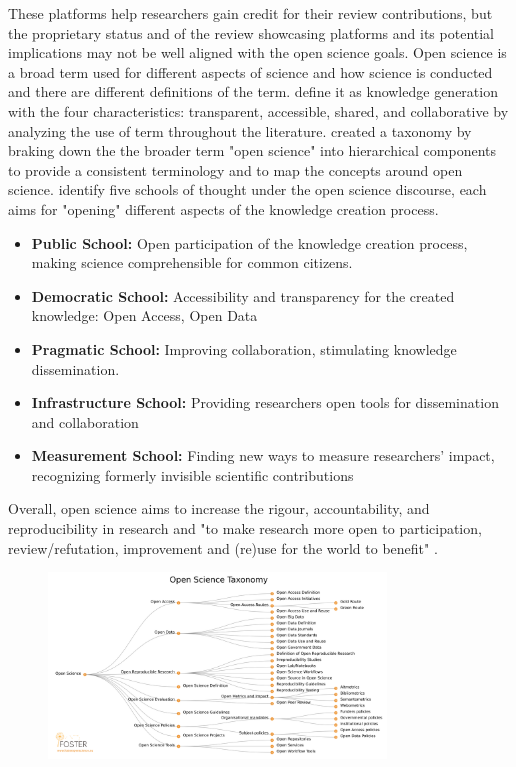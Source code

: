 These platforms help researchers gain credit for their review contributions, but the proprietary status and of the review showcasing platforms and its potential implications may not be well aligned with the open science goals. Open science is a broad term used for different aspects of science and how science is conducted and there are different definitions of the term. \cite{VicenteSaez.2018} define it as knowledge generation with the four characteristics: transparent, accessible, shared, and collaborative by analyzing the use of term throughout the literature. \cite{Pontika.2015} created a taxonomy by braking down the the broader term "open science" into hierarchical components to provide a consistent terminology and to map the concepts around open science. \cite{Fecher.2013} identify five  schools of thought under the open science discourse, each aims for "opening" different aspects of the knowledge creation process. 

\begin{itemize}
    \item \textbf{Public School:} Open participation of the knowledge creation process, making science comprehensible for common citizens.
    \item \textbf{Democratic School:} Accessibility and transparency for the created knowledge: Open Access, Open Data
    \item \textbf{Pragmatic School:} Improving collaboration, stimulating knowledge dissemination.
    \item \textbf{Infrastructure School:} Providing researchers open tools for dissemination and collaboration 
    \item \textbf{Measurement School:} Finding new ways to measure researchers' impact, recognizing formerly invisible scientific contributions
\end{itemize}

Overall, open science aims to increase the rigour, accountability, and reproducibility in research and "to make research more open to participation, review/refutation, improvement and (re)use for the world to benefit" \parencite{Bezjak.2018}.

\begin{figure}[htpb]
  \centering
  \includegraphics[width=0.8\textwidth]{figures/FOSTER.png}
  \caption{\parencite{Pontika.2015}} \label{fig:foster}
\end{figure}

